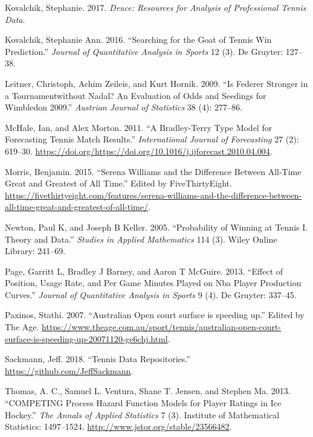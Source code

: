 \documentclass[]{article}
\begin{document}
\leavevmode\hypertarget{ref-deuce2017}{}%
Kovalchik, Stephanie. 2017. \emph{Deuce: Resources for Analysis of
Professional Tennis Data}.

\leavevmode\hypertarget{ref-kovalchik2016}{}%
Kovalchik, Stephanie Ann. 2016. ``Searching for the Goat of Tennis Win
Prediction.'' \emph{Journal of Quantitative Analysis in Sports} 12 (3).
De Gruyter: 127--38.

\leavevmode\hypertarget{ref-leitner2009}{}%
Leitner, Christoph, Achim Zeileis, and Kurt Hornik. 2009. ``Is Federer
Stronger in a Tournamentwithout Nadal? An Evaluation of Odds and
Seedings for Wimbledon 2009.'' \emph{Austrian Journal of Statistics} 38
(4): 277--86.

\leavevmode\hypertarget{ref-mchale2011}{}%
McHale, Ian, and Alex Morton. 2011. ``A Bradley-Terry Type Model for
Forecasting Tennis Match Results.'' \emph{International Journal of
Forecasting} 27 (2): 619--30.
\url{https://doi.org/https://doi.org/10.1016/j.ijforecast.2010.04.004}.

\leavevmode\hypertarget{ref-five2015}{}%
Morris, Benjamin. 2015. ``Serena Williams and the Difference Between
All-Time Great and Greatest of All Time.'' Edited by FiveThirtyEight.
\url{https://fivethirtyeight.com/features/serena-williams-and-the-difference-between-all-time-great-and-greatest-of-all-time/}.

\leavevmode\hypertarget{ref-newton2005}{}%
Newton, Paul K, and Joseph B Keller. 2005. ``Probability of Winning at
Tennis I. Theory and Data.'' \emph{Studies in Applied Mathematics} 114
(3). Wiley Online Library: 241--69.

\leavevmode\hypertarget{ref-page2013}{}%
Page, Garritt L, Bradley J Barney, and Aaron T McGuire. 2013. ``Effect
of Position, Usage Rate, and Per Game Minutes Played on Nba Player
Production Curves.'' \emph{Journal of Quantitative Analysis in Sports} 9
(4). De Gruyter: 337--45.

\leavevmode\hypertarget{ref-theage2007}{}%
Paxinos, Stathi. 2007. ``Australian Open court surface is speeding up.''
Edited by The Age.
\url{https://www.theage.com.au/sport/tennis/australian-open-court-surface-is-speeding-up-20071120-ge6chj.html}.

\leavevmode\hypertarget{ref-sackmann2018}{}%
Sackmann, Jeff. 2018. ``Tennis Data Repositories.''
\url{https://github.com/JeffSackmann}.

\leavevmode\hypertarget{ref-thomas2013}{}%
Thomas, A. C., Samuel L. Ventura, Shane T. Jensen, and Stephen Ma. 2013.
``COMPETING Process Hazard Function Models for Player Ratings in Ice
Hockey.'' \emph{The Annals of Applied Statistics} 7 (3). Institute of
Mathematical Statistics: 1497--1524.
\url{http://www.jstor.org/stable/23566482}.
\end{document}
